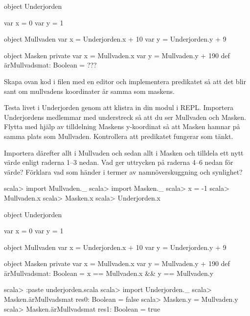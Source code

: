 \begin{Code}
object Underjorden {
  var x = 0
  var y = 1

  object Mullvaden {
    var x = Underjorden.x + 10
    var y = Underjorden.y + 9
  }

  object Masken {
    private var x = Mullvaden.x
    var y = Mullvaden.y + 190
    def ärMullvadsmat: Boolean = ???
  }
}
\end{Code}

\Subtask Skapa ovan kod i filen  med en editor och implementera predikatet   så att det blir sant om mullvadens koordinater är samma som maskens.

\Subtask Testa livet i Underjorden genom att klistra in din modul i REPL. Importera Underjordens medlemmar med understreck så att du ser Mullvaden och Masken. Flytta med hjälp av tilldelning Maskens y-koordinat så att Masken hamnar på samma plats som Mullvaden. Kontrollera att predikatet  fungerar som tänkt.

 \Subtask Importera därefter allt i Mullvaden och sedan allt i Masken och tilldela  ett nytt värde enligt raderna 1--3 nedan. Vad ger uttrycken på raderna 4--6 nedan för värde? Förklara vad som händer i termer av namnöverskuggning och synlighet?

\begin{REPL}
scala> import Mullvaden._
scala> import Masken._
scala> x = -1
scala> Mullvaden.x
scala> Masken.x
scala> Underjorden.x
\end{REPL}

\SOLUTION

\TaskSolved \what

\SubtaskSolved

\begin{Code}
object Underjorden {
  var x = 0
  var y = 1

  object Mullvaden {
    var x = Underjorden.x + 10
    var y = Underjorden.y + 9
  }

  object Masken {
    private var x = Mullvaden.x
    var y = Mullvaden.y + 190
    def ärMullvadsmat: Boolean = x == Mullvaden.x && y == Mullvaden.y
  }
}
\end{Code}

\SubtaskSolved

\begin{REPL}
scala> :paste underjorden.scala
scala> import Underjorden._
scala> Masken.ärMullvadsmat
res0: Boolean = false
scala> Masken.y = Mullvaden.y
scala> Masken.ärMullvadsmat
res1: Boolean = true
\end{REPL}


